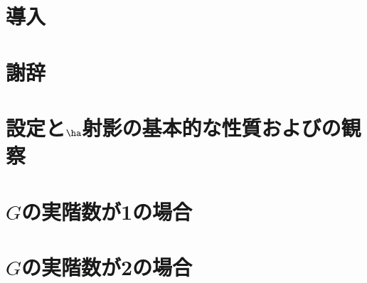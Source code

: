 \documentclass[12pt,dvipdfmx,uplatex]{jsarticle}
\begin{document}


\newgeometry{}

\makeatletter

\renewcommand*{\l@section}[2]{%
  \ifnum \c@tocdepth >\z@
    \addpenalty{\@secpenalty}%
    \addvspace{1.0em \@plus\p@}%
    \begingroup
      \parindent\z@
      \rightskip\@tocrmarg
      \parfillskip-\rightskip
      \leavevmode\headfont
      \setlength\@lnumwidth{1.5em}%
      \advance\leftskip\@lnumwidth \hskip-\leftskip
      #1\nobreak
      \leaders\hbox{\normalfont$\m@th \mkern \@dotsep mu\hbox{.}\mkern \@dotsep mu$}\hfill %
      \nobreak\hbox to\@pnumwidth{\hss#2}\par
    \endgroup
  \fi}

\makeatother


\setcounter{tocdepth}{3}
\tableofcontents

\allowdisplaybreaks[0]

\clearpage

\section*{導入}


\section*{謝辞}

% 

\clearpage

\section{設定と$\ha$射影の基本的な性質およびの観察}



\section{$G$の実階数が1の場合}




\section{$G$の実階数が2の場合}


\begin{thebibliography}{99}
  
\end{thebibliography}
\end{document}
